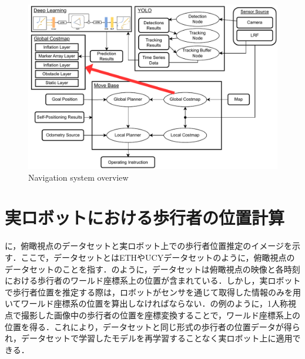 \begin{figure}[H]
  \centering
 \includegraphics[keepaspectratio, scale=0.77]
      {images/application_system.pdf}
 \caption{Navigation system overview}
 \label{Fig:nav-system}
\end{figure}

\vspace{-30pt}

\section{実ロボットにおける歩行者の位置計算}\label{sec:real-robot}
に，俯瞰視点のデータセットと実ロボット上での歩行者位置推定のイメージを示す．ここで，データセットとはETH\cite{pellegrini2009you-eth}やUCY\cite{lerner2007crowds-ucy}データセットのように，俯瞰視点のデータセットのことを指す．のように，データセットは俯瞰視点の映像と各時刻における歩行者のワールド座標系上の位置が含まれている．しかし，実ロボットで歩行者位置を推定する際は，ロボットがセンサを通じて取得した情報のみを用いてワールド座標系の位置を算出しなければならない．の例のように，1人称視点で撮影した画像中の歩行者の位置を座標変換することで，ワールド座標系上の位置を得る．これにより，データセットと同じ形式の歩行者の位置データが得られ，データセットで学習したモデルを再学習することなく実ロボット上に適用できる．

